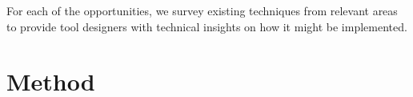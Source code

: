 For each of the opportunities, we survey existing techniques from relevant areas to provide tool designers with technical insights on how it might be implemented.





\section{Method}
\label{sec:interview-methods}

